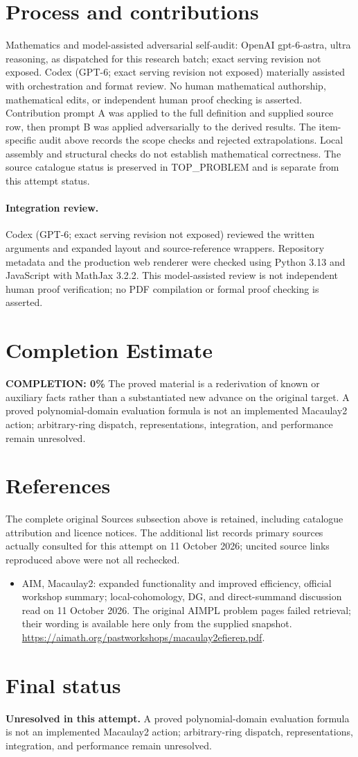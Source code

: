 \documentclass[11pt]{article}
\begin{document}
\section{Process and contributions}
Mathematics and model-assisted adversarial self-audit: OpenAI gpt-6-astra, ultra reasoning, as dispatched for this research batch; exact serving revision not exposed. Codex (GPT-6; exact serving revision not exposed) materially assisted with orchestration and format review. No human mathematical authorship, mathematical edits, or independent human proof checking is asserted.
Contribution prompt A was applied to the full definition and supplied source row, then prompt B was applied adversarially to the derived results. The item-specific audit above records the scope checks and rejected extrapolations. Local assembly and structural checks do not establish mathematical correctness. The source catalogue status is preserved in TOP\_PROBLEM and is separate from this attempt status.
\paragraph{Integration review.} Codex (GPT-6; exact serving revision not exposed) reviewed the written arguments and expanded layout and source-reference wrappers. Repository metadata and the production web renderer were checked using Python 3.13 and JavaScript with MathJax 3.2.2. This model-assisted review is not independent human proof verification; no PDF compilation or formal proof checking is asserted.

\section{Completion Estimate}
\noindent\textbf{COMPLETION: 0\%}
The proved material is a rederivation of known or auxiliary facts rather than a substantiated new advance on the original target. A proved polynomial-domain evaluation formula is not an implemented Macaulay2 action; arbitrary-ring dispatch, representations, integration, and performance remain unresolved.
\section{References}
The complete original Sources subsection above is retained, including catalogue attribution and licence notices. The additional list records primary sources actually consulted for this attempt on 11 October 2026; uncited source links reproduced above were not all rechecked.
\begin{itemize}
\item AIM, Macaulay2: expanded functionality and improved efficiency, official workshop summary; local-cohomology, DG, and direct-summand discussion read on 11 October 2026. The original AIMPL problem pages failed retrieval; their wording is available here only from the supplied snapshot. \url{https://aimath.org/pastworkshops/macaulay2efierep.pdf}.
\end{itemize}
\section{Final status}
\textbf{Unresolved in this attempt.} A proved polynomial-domain evaluation formula is not an implemented Macaulay2 action; arbitrary-ring dispatch, representations, integration, and performance remain unresolved.
\end{document}
